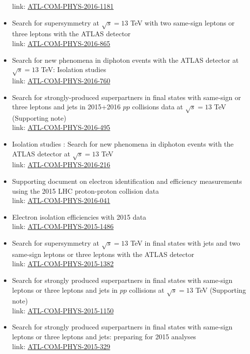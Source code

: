 \documentclass[12pt]{article}
\begin{document}
\begin{itemize}
      link: \href{https://cds.cern.ch/record/2209586}{ATL-COM-PHYS-2016-1181}
\item Search for supersymmetry at $\sqrt{s} = 13$ TeV with two same-sign leptons or three leptons with the ATLAS detector\\
      link: \href{https://cds.cern.ch/record/2196580}{ATL-COM-PHYS-2016-865}
\item Search for new phenomena in diphoton events with the ATLAS detector at $\sqrt{s} = 13$ TeV: Isolation studies\\
      link: \href{https://cds.cern.ch/record/2162758}{ATL-COM-PHYS-2016-760}
\item Search for strongly-produced superpartners in final states with same-sign or three leptons and jets in 2015+2016 $pp$ collisions data at $\sqrt{s} = 13$ TeV (Supporting note)\\
      link: \href{https://cds.cern.ch/record/2151944}{ATL-COM-PHYS-2016-495}
\item Isolation studies : Search for new phenomena in diphoton events with the ATLAS detector at $\sqrt{s} = 13$ TeV\\
      link: \href{https://cds.cern.ch/record/2136940}{ATL-COM-PHYS-2016-216}
\item Supporting document on electron identification and efficiency measurements using the 2015 LHC proton-proton collision data\\
      link: \href{https://cds.cern.ch/record/2125283}{ATL-COM-PHYS-2016-041}
\item Electron isolation efficiencies with 2015 data\\
      link: \href{https://cds.cern.ch/record/2112167}{ATL-COM-PHYS-2015-1486}
\item Search for supersymmetry at $\sqrt{s} = 13$ TeV in final states with jets and two same-sign leptons or three leptons with the ATLAS detector\\
      link: \href{https://cds.cern.ch/record/2102919}{ATL-COM-PHYS-2015-1382}
\item Search for strongly produced superpartners in final states with same-sign leptons or three leptons and jets in $pp$ collisions at $\sqrt{s} = 13$ TeV (Supporting note)\\
      link: \href{https://cds.cern.ch/record/2052581}{ATL-COM-PHYS-2015-1150}
\item Search for strongly produced superpartners in final states with same-sign leptons or three leptons and jets: preparing for 2015 analyses\\
      link: \href{https://cds.cern.ch/record/2012029}{ATL-COM-PHYS-2015-329}
\end{itemize}
\end{document}

